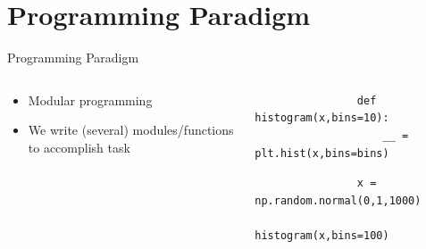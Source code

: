 \documentclass[aspectratio=169]{beamer}
\begin{document}
\section{Programming Paradigm}
%
%
%
%
\begin{frame}[fragile]{Programming Paradigm}
     \begin{columns}
        \begin{column}{0.49\textwidth}
            \begin{itemize}
                \item Modular programming
                \item We write (several) modules/functions to accomplish task
            \end{itemize}
        \end{column}
        \begin{column}{0.49\textwidth}

            \begin{verbatim}
                def histogram(x,bins=10):
                    __ = plt.hist(x,bins=bins)
            \end{verbatim}
            \begin{verbatim}
                x = np.random.normal(0,1,1000)
                histogram(x,bins=100)
            \end{verbatim}
        \end{column}
    \end{columns}
\end{frame} 
%
%
\end{document}
